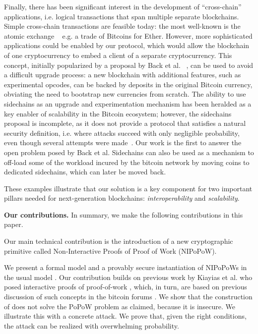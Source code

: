 Finally, there has been significant interest in the development of
``cross-chain'' applications, i.e. logical transactions that span multiple
separate blockchains. Simple cross-chain transactions are feasible today: the
most well-known is the atomic exchange ~\cite{tiernolan} e.g. a trade of
Bitcoins for Ether. However, more sophisticated applications could be enabled by
our protocol, which would allow the blockchain of one cryptocurrency to embed a
client of a separate cryptocurrency. This concept, initially popularized by a
proposal by Back et al. ~\cite{sidechains}, can be used to avoid a difficult
upgrade process: a new blockchain with additional features, such as experimental
opcodes, can be backed by deposits in the original Bitcoin currency, obviating
the need to bootstrap new currencies from scratch. The ability to use sidechains
as an upgrade and experimentation mechanism has been heralded as a key enabler
of scalability in the Bitcoin ecosystem; however, the sidechains proposal is
incomplete, as it does not provide a protocol that satisfies a natural security
definition, i.e. where attacks succeed with only negligible probability, even
though several attempts were made~\cite{pos}\cite{compactspv}. Our work is the
first to answer the open problem posed by Back et al. Sidechains can also be
used as a mechanism to off-load some of the workload incured by the bitcoin
network by moving coins to dedicated sidechains, which can later be moved back.

These examples illustrate that our solution is a key component for two important
pillars needed for next-generation blockchains: \textit{interoperability} and
\textit{scalability}.

\textbf{Our contributions.}
In summary, we make the following contributions in this paper.

Our main technical contribution is the introduction of a new cryptographic
primitive called Non-Interactive Proofs of Proof of Work (NIPoPoW).

We present a formal model and a provably secure instantiation of NIPoPoWs in the
usual model \cite{backbone}. Our contribution builds on previous work by Kiayias
et al. who posed interactive proofs of proof-of-work \cite{KLS}, which, in turn,
are based on previous discussion of such concepts in the bitcoin forums
\cite{highway}. We show that the construction of \cite{KLS} does not solve the
PoPoW problem as claimed, because it is insecure. We illustrate this with a
concrete attack. We prove that, given the right conditions, the attack can be
realized with overwhelming probability.

